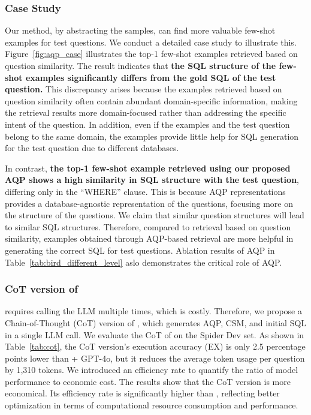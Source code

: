 \subsubsection{Case Study}

Our method, by abstracting the samples, can find more valuable few-shot examples for test questions. 
We conduct a detailed case study to illustrate this. 
Figure~\ref{fig:aqp_case} illustrates the top-1 few-shot examples retrieved based on question similarity. The result indicates that \textbf{the SQL structure of the few-shot examples significantly differs from the gold SQL of the test question. }
This discrepancy arises because the examples retrieved based on question similarity often contain abundant domain-specific information, making the retrieval results more domain-focused rather than addressing the specific intent of the question. 
In addition, even if the examples and the test question belong to the same domain, the examples provide little help for SQL generation for the test question due to different databases.


In contrast, \textbf{the top-1 few-shot example retrieved using our proposed AQP shows a high similarity in SQL structure with the test question}, differing only in the ``WHERE'' clause. 
This is because AQP representations provides a database-agnostic representation of the questions, focusing more on the structure of the questions. 
We claim that similar question structures will lead to similar SQL structures. 
Therefore, compared to retrieval based on question similarity, examples obtained through AQP-based retrieval are more helpful in generating the correct SQL for test questions. Ablation results of AQP in Table~\ref{tab:bird_different_level} aslo demonstrates the critical role of AQP.


\subsubsection{CoT version of \method}

\method requires calling the LLM multiple times, which is costly. Therefore, we propose a Chain-of-Thought (CoT) version of \method, which generates AQP, CSM, and initial SQL in a single LLM call.
We evaluate the CoT of \method on the Spider Dev set.
As shown in Table~\ref{tab:cot}, the CoT version's execution accuracy (EX) is only 2.5 percentage points lower than \method+ GPT-4o, but it reduces the average token usage per question by 1,310 tokens. We introduced an efficiency rate to quantify the ratio of model performance to economic cost. 
The results show that the CoT version is more economical. Its efficiency rate is significantly higher than \method, reflecting better optimization in terms of computational resource consumption and performance.



